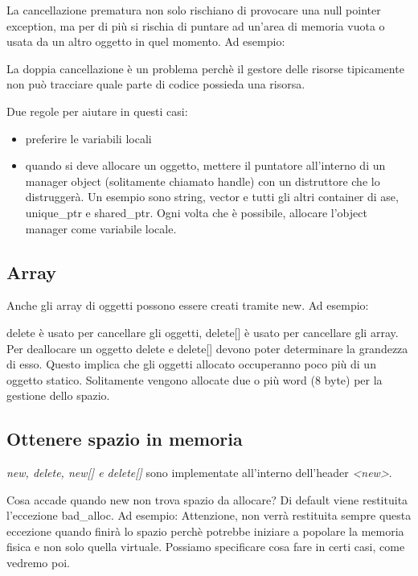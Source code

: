 \documentclass[11pt,a4paper]{book}
\begin{document}
La cancellazione prematura non solo rischiano di provocare una null pointer exception, ma per di più si rischia di puntare ad un'area di memoria vuota o usata da un altro oggetto in quel momento. Ad esempio:
\label{code: 156}

La doppia cancellazione è un problema perchè il gestore delle risorse tipicamente non può tracciare quale parte di codice possieda una risorsa.
\label{code: 157}

Due regole per aiutare in questi casi:
\begin{itemize}
	\item preferire le variabili locali
	\item quando si deve allocare un oggetto, mettere il puntatore all'interno di un manager object (solitamente chiamato handle) con un distruttore che lo distruggerà. Un esempio sono string, vector e tutti gli altri container di ase, unique\_ptr e shared\_ptr. Ogni volta che è possibile, allocare l'object manager come variabile locale.
\end{itemize}

\subsection{Array}
Anche gli array di oggetti possono essere creati tramite new. Ad esempio:
\label{code: 158}

delete è usato per cancellare gli oggetti, delete[] è usato per cancellare gli array. Per deallocare un oggetto delete e delete[] devono poter determinare la grandezza di esso. Questo implica che gli oggetti allocato occuperanno poco più di un oggetto statico. Solitamente vengono allocate due o più word (8 byte) per la gestione dello spazio.

\subsection{Ottenere spazio in memoria}
\emph{new, delete, new[] e delete[]} sono implementate all'interno dell'header \emph{<new>}.

\label{code: 159}
Cosa accade quando new non trova spazio da allocare? Di default viene restituita l'eccezione bad\_alloc. Ad esempio:
\label{code: 160}
Attenzione, non verrà restituita sempre questa eccezione quando finirà lo spazio perchè potrebbe iniziare a popolare la memoria fisica e non solo quella virtuale. Possiamo specificare cosa fare in certi casi, come vedremo poi.
\end{document}
